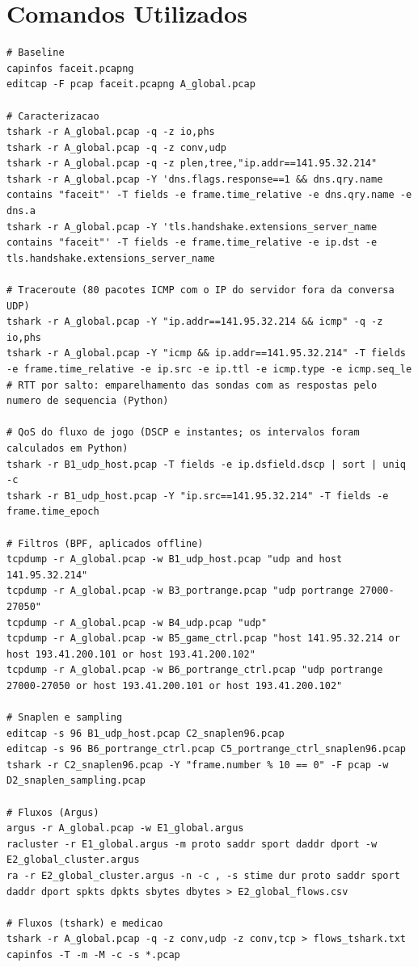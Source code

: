 \documentclass[10.5pt,a4paper]{article}
\begin{document}
\section{Comandos Utilizados}
\begin{lstlisting}
# Baseline
capinfos faceit.pcapng
editcap -F pcap faceit.pcapng A_global.pcap

# Caracterizacao
tshark -r A_global.pcap -q -z io,phs
tshark -r A_global.pcap -q -z conv,udp
tshark -r A_global.pcap -q -z plen,tree,"ip.addr==141.95.32.214"
tshark -r A_global.pcap -Y 'dns.flags.response==1 && dns.qry.name contains "faceit"' -T fields -e frame.time_relative -e dns.qry.name -e dns.a
tshark -r A_global.pcap -Y 'tls.handshake.extensions_server_name contains "faceit"' -T fields -e frame.time_relative -e ip.dst -e tls.handshake.extensions_server_name

# Traceroute (80 pacotes ICMP com o IP do servidor fora da conversa UDP)
tshark -r A_global.pcap -Y "ip.addr==141.95.32.214 && icmp" -q -z io,phs
tshark -r A_global.pcap -Y "icmp && ip.addr==141.95.32.214" -T fields -e frame.time_relative -e ip.src -e ip.ttl -e icmp.type -e icmp.seq_le
# RTT por salto: emparelhamento das sondas com as respostas pelo numero de sequencia (Python)

# QoS do fluxo de jogo (DSCP e instantes; os intervalos foram calculados em Python)
tshark -r B1_udp_host.pcap -T fields -e ip.dsfield.dscp | sort | uniq -c
tshark -r B1_udp_host.pcap -Y "ip.src==141.95.32.214" -T fields -e frame.time_epoch

# Filtros (BPF, aplicados offline)
tcpdump -r A_global.pcap -w B1_udp_host.pcap "udp and host 141.95.32.214"
tcpdump -r A_global.pcap -w B3_portrange.pcap "udp portrange 27000-27050"
tcpdump -r A_global.pcap -w B4_udp.pcap "udp"
tcpdump -r A_global.pcap -w B5_game_ctrl.pcap "host 141.95.32.214 or host 193.41.200.101 or host 193.41.200.102"
tcpdump -r A_global.pcap -w B6_portrange_ctrl.pcap "udp portrange 27000-27050 or host 193.41.200.101 or host 193.41.200.102"

# Snaplen e sampling
editcap -s 96 B1_udp_host.pcap C2_snaplen96.pcap
editcap -s 96 B6_portrange_ctrl.pcap C5_portrange_ctrl_snaplen96.pcap
tshark -r C2_snaplen96.pcap -Y "frame.number % 10 == 0" -F pcap -w D2_snaplen_sampling.pcap

# Fluxos (Argus)
argus -r A_global.pcap -w E1_global.argus
racluster -r E1_global.argus -m proto saddr sport daddr dport -w E2_global_cluster.argus
ra -r E2_global_cluster.argus -n -c , -s stime dur proto saddr sport daddr dport spkts dpkts sbytes dbytes > E2_global_flows.csv

# Fluxos (tshark) e medicao
tshark -r A_global.pcap -q -z conv,udp -z conv,tcp > flows_tshark.txt
capinfos -T -m -M -c -s *.pcap
\end{lstlisting}
\end{document}
